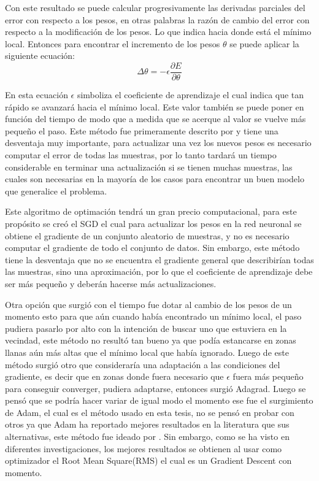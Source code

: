 \par Con este resultado se puede calcular progresivamente las derivadas parciales del error con respecto a los pesos, en otras palabras la razón de cambio del error con respecto a la modificación de los pesos. Lo que indica hacia donde está el mínimo local. Entonces para encontrar el incremento de los pesos $\theta$ se puede aplicar la siguiente ecuación:
\[ \Delta \theta =-\epsilon \frac{\partial E}{\partial \theta }\]

\par En esta ecuación $\epsilon$ simboliza el coeficiente de aprendizaje el cual indica que tan rápido se avanzará hacia el mínimo local. Este valor también se puede poner en función del tiempo de modo que a medida que se acerque al valor se vuelve más pequeño el paso. Este método fue primeramente descrito por \textcite{rumelhart1986learning} y tiene una desventaja muy importante, para actualizar una vez los nuevos pesos es necesario computar el error de todas las muestras, por lo tanto tardará un tiempo considerable en terminar una actualización si se tienen muchas muestras, las cuales son necesarias en la mayoría de los casos para encontrar un buen modelo que generalice el problema.

\par Este algoritmo de optimación tendrá un gran precio computacional, para este propósito se creó el \gls{SGD} el cual para actualizar los pesos en la red neuronal se obtiene el gradiente de un conjunto aleatorio de muestras, y no es necesario computar el gradiente de todo el conjunto de datos. Sin embargo, este método tiene la desventaja que no se encuentra el gradiente general que describirían todas las muestras, sino una aproximación, por lo que el coeficiente de aprendizaje debe ser más pequeño y deberán hacerse más actualizaciones.

\par Otra opción que surgió con el tiempo fue dotar al cambio de los pesos de un momento esto para que aún cuando había encontrado un mínimo local, el paso pudiera pasarlo por alto con la intención de buscar uno que estuviera en la vecindad, este método no resultó tan bueno ya que podía estancarse en zonas llanas aún más altas que el mínimo local que había ignorado. Luego de este método surgió otro que consideraría una adaptación a las condiciones del gradiente, es decir que en zonas donde fuera necesario que $\epsilon$ fuera más pequeño para conseguir converger, pudiera adaptarse, entonces surgió Adagrad. Luego se pensó que se podría hacer variar de igual modo el momento ese fue el surgimiento de Adam, el cual es el método usado en esta tesis, no se pensó en probar con otros ya que Adam ha reportado mejores resultados en la literatura que sus alternativas, este método fue ideado por \textcite{kingma2014adam}.  Sin embargo, como se ha visto en diferentes investigaciones, los mejores resultados se obtienen al usar como optimizador el Root Mean Square(RMS) el cual es un Gradient Descent con momento.
\nocite{DBLP:journals/corr/Ruder16}


